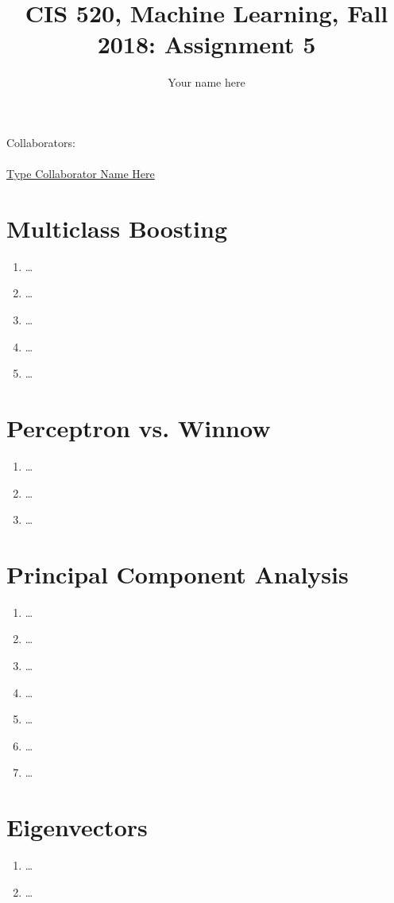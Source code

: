 \documentclass[english]{article}
\title{CIS 520, Machine Learning, Fall 2018: Assignment 5}
\author{Your name here}
\begin{document}
\maketitle

{\normalsize \noindent Collaborators: \\ 
\\ \underline{ Type Collaborator Name Here        }} \\

\section{Multiclass Boosting}
\begin{enumerate}[a]
    \item \ldots
    \item \ldots
    \item \ldots
    \item \ldots
    \item \ldots
\end{enumerate}
\section{Perceptron vs. Winnow}
\begin{enumerate}[a]
    \item \ldots
    \item \ldots
    \item \ldots
\end{enumerate}
\section{Principal Component Analysis}
\begin{enumerate}
    \item \ldots
    \item \ldots
    \item \ldots
    \item \ldots 
    \item \ldots
    \item \ldots
    \item \ldots
\end{enumerate}
\section{Eigenvectors}
\begin{enumerate}[a]
    \item \ldots
    \item \ldots
\end{enumerate}
\end{document}
